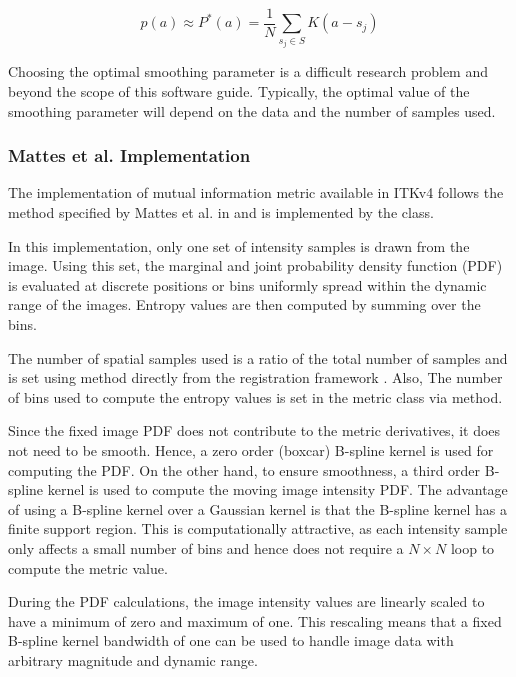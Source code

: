 \begin{equation}
p(a) \approx P^{*}(a) = \frac{1}{N} \sum_{s_j \in S} K\left(a - s_j\right)
\end{equation}

Choosing the optimal smoothing parameter is a difficult research problem and
beyond the scope of this software guide.  Typically, the optimal value of the
smoothing parameter will depend on the data and the number of samples used.

\subsubsection{Mattes et al. Implementation}
The implementation of mutual information metric available in ITKv4 follows
the method specified by Mattes et al. in \cite{Mattes2001} and is implemented
by the  class.

In this implementation, only one set of intensity samples is drawn from the
image.  Using this set, the marginal and joint probability density function
(PDF) is evaluated at discrete positions or bins uniformly spread within the
dynamic range of the images. Entropy values are then computed by summing over
the bins.


The number of spatial samples used is a ratio of the total number of samples
and is set using method  directly from
the registration framework . Also, The number
of bins used to compute the entropy values is set in the metric class
via  method.

Since the fixed image PDF does not contribute to the metric derivatives, it
does not need to be smooth. Hence, a zero order (boxcar) B-spline kernel is
used for computing the PDF. On the other hand, to ensure smoothness, a third
order B-spline kernel is used to compute the moving image intensity PDF. The
advantage of using a B-spline kernel over a Gaussian kernel is that the
B-spline kernel has a finite support region. This is computationally
attractive, as each intensity sample only affects a small number of bins and
hence does not require a $N \times N$ loop to compute the metric value.

During the PDF calculations, the image intensity values are linearly scaled
to have a minimum of zero and maximum of one. This rescaling means that a
fixed B-spline kernel bandwidth of one can be used to handle image data with
arbitrary magnitude and dynamic range.


